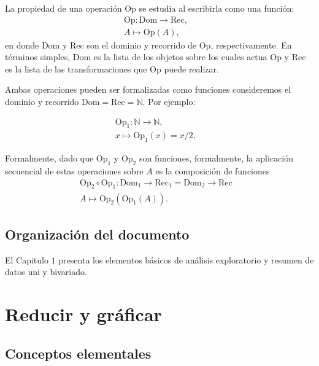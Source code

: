 \documentclass[]{book}
\theoremstyle{definition}
\theoremstyle{definition}
\theoremstyle{definition}
\theoremstyle{remark}
\begin{document}
La propiedad de una operación Op se estudia al escribirla como
una función:\\
\[  \begin{aligned}
  \mbox{Op}: \mbox{Dom} \to \mbox{Rec}, & \\
  A \mapsto \mbox{Op}(A),&
  \end{aligned}
  \] en donde Dom y Rec son el dominio y recorrido de Op,
respectivamente. En términos simples, Dom es la lista de los
objetos sobre los cuales actua Op y Rec es la lista de las
transformaciones que Op puede realizar.

Ambas operaciones pueden ser formalizadas como funciones
consideremos el dominio y recorrido
\(\mbox{Dom}=\mbox{Rec}=\mathbb{N}\). Por ejemplo:

\[  \begin{aligned}
  \mbox{Op}_1: \mathbb{N} \to \mathbb{N}, & \\
  x \mapsto \mbox{Op}_1(x)= x/2,&
  \end{aligned} \]

Formalmente, dado que \(\mbox{Op}_1\) y \(\mbox{Op}_2\) son funciones,
formalmente, la aplicación secuencial de estas operaciones sobre
\(A\) es la composición de funciones\\
\[
  \begin{aligned}
  \mbox{Op}_2 \circ \mbox{Op}_1: \mbox{Dom}_1 \to \mbox{Rec}_1=\mbox{Dom}_2
  \to \mbox{Rec}& \\
  A \mapsto    \mbox{Op}_2\left( 
    \mbox{Op}_1(A) \right).&
  \end{aligned}
  \]

\hypertarget{organizaciuxf3n-del-documento}{%
\section*{Organización del documento}\label{organizaciuxf3n-del-documento}}

El Capitulo \(1\) presenta los elementos básicos de análisis
exploratorio y resumen de datos uni y bivariado.

\hypertarget{datos}{%
\chapter{Reducir y gráficar}\label{datos}}

\hypertarget{conceptos-elementales}{%
\section{Conceptos elementales}\label{conceptos-elementales}}
\end{document}
